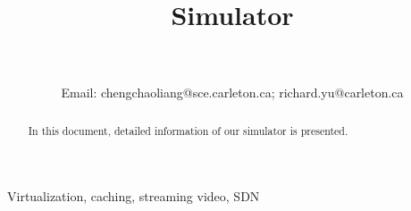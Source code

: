 \documentclass[onecolumn, 12pt]{IEEEtran}
\begin{document}
\title{\huge{Simulator}}
\author{\\
\\
\normalsize{Email: chengchaoliang@sce.carleton.ca; richard.yu@carleton.ca}
}
\maketitle
\vspace{-0.6cm}
\begin{abstract}
In this document, detailed information of our simulator is presented. 

\end{abstract}

\begin{IEEEkeywords}
Virtualization, caching, streaming video, SDN
\end{IEEEkeywords}

\IEEEpeerreviewmaketitle

\end{document}
